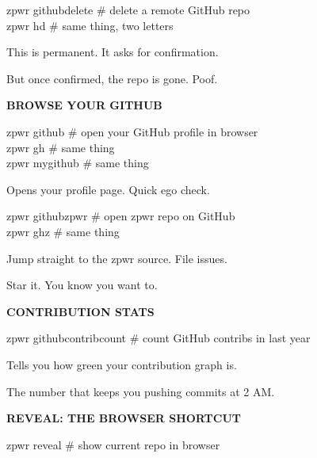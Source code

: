 \documentclass[11pt,a4paper,twoside]{book}
\begin{document}
\begin{codebox}
zpwr githubdelete      \# delete a remote GitHub repo\\
zpwr hd               \# same thing, two letters\\
\end{codebox}

This is permanent. It asks for confirmation.

But once confirmed, the repo is gone. Poof.


\vspace{12pt}
{\bfseries\color{neonyellow} BROWSE YOUR GITHUB}\vspace{4pt}

\begin{codebox}
zpwr github            \# open your GitHub profile in browser\\
zpwr gh               \# same thing\\
zpwr mygithub          \# same thing\\
\end{codebox}

Opens your profile page. Quick ego check.

\begin{codebox}
zpwr githubzpwr        \# open zpwr repo on GitHub\\
zpwr ghz              \# same thing\\
\end{codebox}

Jump straight to the zpwr source. File issues.

Star it. You know you want to.


\vspace{12pt}
{\bfseries\color{neonyellow} CONTRIBUTION STATS}\vspace{4pt}

\begin{codebox}
zpwr githubcontribcount \# count GitHub contribs in last year\\
\end{codebox}

Tells you how green your contribution graph is.

The number that keeps you pushing commits at 2 AM.


\vspace{12pt}
{\bfseries\color{neonyellow} REVEAL: THE BROWSER SHORTCUT}\vspace{4pt}

\begin{codebox}
zpwr reveal            \# show current repo in browser\\
\end{codebox}
\end{document}
